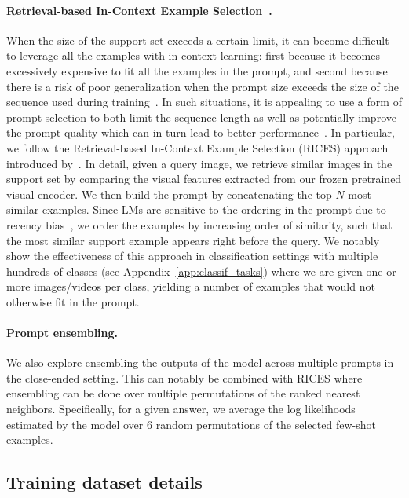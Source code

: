 \paragraph{Retrieval-based In-Context Example Selection~\citep{yang2021empirical}.}
\label{app:rices}
When the size of the support set exceeds a certain limit, it can become difficult to leverage all the examples with in-context learning:
first because it becomes excessively expensive to fit all the examples in the prompt, and second because there is a risk of poor generalization when the prompt size exceeds the size of the sequence used during training~\citep{press2021train}.
In such situations, it is appealing to use a form of prompt selection to both limit the sequence length as well as potentially improve the prompt quality which can in turn lead to better performance~\citep{liu2021makes}.
In particular, we follow the  Retrieval-based In-Context Example Selection (RICES) approach introduced by~\cite{yang2021empirical}.
In detail, given a query image, we retrieve similar images in the support set by comparing the visual features extracted from our frozen pretrained visual encoder.
We then build the prompt by concatenating the top-$N$ most similar examples.
Since LMs are sensitive to the ordering in the prompt due to recency bias~\citep{zhao2021calibrate}, we order the examples by increasing order of similarity, such that the most similar support example appears right before the query.
We notably show the effectiveness of this approach in classification settings with multiple hundreds of classes (see Appendix~\ref{app:classif_tasks}) where we are given one or more images/videos per class, yielding a number of examples that would not otherwise fit in the prompt.

\paragraph{Prompt ensembling.}
We also explore ensembling the outputs of the model across multiple prompts in the close-ended setting.
This can notably be combined with RICES where ensembling can be done over multiple permutations of the ranked nearest neighbors.
Specifically, for a given answer, we average the log likelihoods estimated by the model over 6 random permutations of the selected few-shot examples.


\subsection{Training dataset details}



